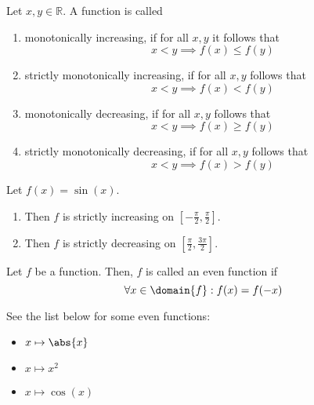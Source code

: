 \begin{definition}\label{def-monotonicity}
    Let $x,y\in\mathbb{R}$. A function is called
    \begin{enumerate}
        \item monotonically increasing, if for all $x,y$ it follows that
        \begin{equation}\label{eq-monotonically-increasing}
            x<y \implies f(x)\leq f(y)
        \end{equation}
        \item strictly monotonically increasing, if for all $x,y$ follows that
        \begin{equation}\label{eq-strictly-monotonically-increasing}
            x<y \implies f(x)<f(y)
        \end{equation}
        \item monotonically decreasing, if for all $x,y$ follows that
        \begin{equation}\label{eq-monotonically-decreasing}
            x<y \implies f(x)\geq f(y)
        \end{equation}
        \item strictly monotonically decreasing, if for all $x,y$ follows that
        \begin{equation}\label{eq-strictly-monotonically-decreasing}
            x<y \implies f(x)>f(y)
        \end{equation}
    \end{enumerate}
\end{definition}

\begin{exm}
    Let $f(x)=\sin(x)$.
    \begin{enumerate}
        \item Then $f$ is strictly increasing on $[-\tfrac{\pi}{2},\tfrac{\pi}{2}]$.
        \item Then $f$ is strictly decreasing on $[\tfrac{\pi}{2},\tfrac{3\pi}{2}]$.
    \end{enumerate}
\end{exm}

\begin{definition}\label{def-even-function}
    Let $f$ be a function. Then, $f$ is called an even function if
    \begin{equation}
        \forall x\in\domain{f}:f(x)=f(-x)
    \end{equation}
\end{definition}

\begin{exm}
    See the list below for some even functions:
    \begin{itemize}
        \item $x\mapsto\abs{x}$
        \item $x\mapsto x^2$
        \item $x\mapsto\cos(x)$
    \end{itemize}
\end{exm}

